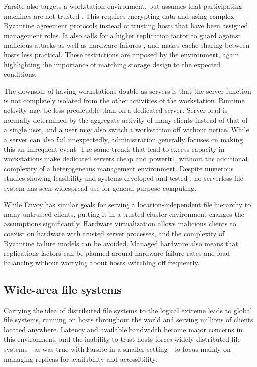 Farsite also targets a workstation environment, but assumes that participating machines are not trusted \cite{adya}. This requires encrypting data and using complex Byzantine agreement protocols instead of trusting hosts that have been assigned management roles. It also calls for a higher replication factor to guard against malicious attacks as well as hardware failures \cite{dahlin94a}, and makes cache sharing between hosts less practical. These restrictions are imposed by the environment, again highlighting the importance of matching storage design to the expected conditions.

The downside of having workstations double as servers is that the server function is not completely isolated from the other activities of the workstation. Runtime activity may be less predictable than on a dedicated server. Server load is normally determined by the aggregate activity of many clients instead of that of a single user, and a user may also switch a workstation off without notice. While a server can also fail unexpectedly, administration generally focuses on making this an infrequent event. The same trends that lead to excess capacity in workstations make dedicated servers cheap and powerful, without the additional complexity of a heterogeneous management environment. Despite numerous studies \cite{bolosky,douceur99,douceur01} showing feasibility and systems developed and tested \cite{adya,walker}, no serverless file system has seen widespread use for general-purpose computing.

While Envoy has similar goals for serving a location-independent file hierarchy to many untrusted clients, putting it in a trusted cluster environment changes the assumptions significantly. Hardware virtualization allows malicious clients to coexist on hardware with trusted server processes, and the complexity of Byzantine failure models can be avoided. Managed hardware also means that replications factors can be planned around hardware failure rates and load balancing without worrying about hosts switching off frequently.

\subsection{Wide-area file systems}

Carrying the idea of distributed file systems to the logical extreme leads to global file systems, running on hosts throughout the world and serving millions of clients located anywhere. Latency and available bandwidth become major concerns in this environment, and the inability to trust hosts forces widely-distributed file systems---as was true with Farsite in a smaller setting---to focus mainly on managing replicas for availability and accessibility.

